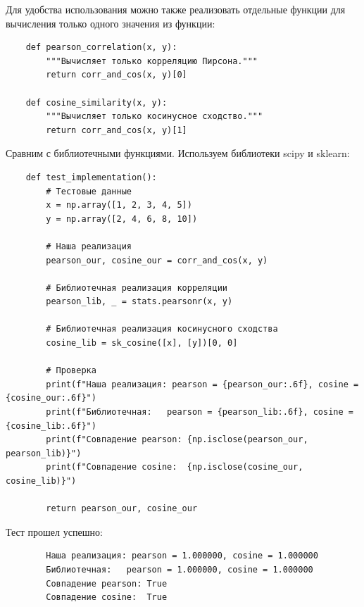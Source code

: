 \documentclass[pract]{SCWorks}
\begin{document}
    Для удобства использования можно также реализовать отдельные функции для вычисления только одного значения из функции:
    \begin{verbatim}
    def pearson_correlation(x, y):
        """Вычисляет только корреляцию Пирсона."""
        return corr_and_cos(x, y)[0]

    def cosine_similarity(x, y):
        """Вычисляет только косинусное сходство."""
        return corr_and_cos(x, y)[1]
    \end{verbatim}

    Сравним с библиотечными функциями. Используем библиотеки scipy и sklearn:
    \begin{verbatim}
    def test_implementation():
        # Тестовые данные
        x = np.array([1, 2, 3, 4, 5])
        y = np.array([2, 4, 6, 8, 10])

        # Наша реализация
        pearson_our, cosine_our = corr_and_cos(x, y)

        # Библиотечная реализация корреляции
        pearson_lib, _ = stats.pearsonr(x, y)

        # Библиотечная реализация косинусного сходства
        cosine_lib = sk_cosine([x], [y])[0, 0]

        # Проверка
        print(f"Наша реализация: pearson = {pearson_our:.6f}, cosine = {cosine_our:.6f}")
        print(f"Библиотечная:   pearson = {pearson_lib:.6f}, cosine = {cosine_lib:.6f}")
        print(f"Совпадение pearson: {np.isclose(pearson_our, pearson_lib)}")
        print(f"Совпадение cosine:  {np.isclose(cosine_our, cosine_lib)}")

        return pearson_our, cosine_our
    \end{verbatim}
    Тест прошел успешно:
    \begin{verbatim}
        Наша реализация: pearson = 1.000000, cosine = 1.000000
        Библиотечная:   pearson = 1.000000, cosine = 1.000000
        Совпадение pearson: True
        Совпадение cosine:  True
    \end{verbatim}
\end{document}
